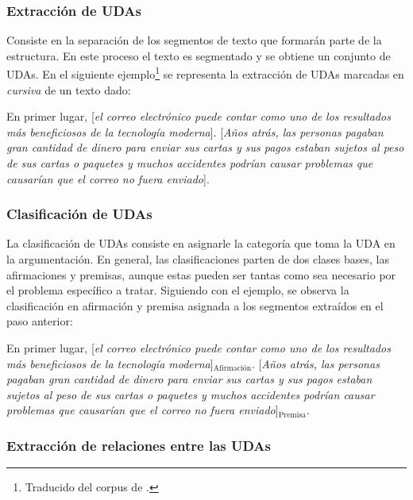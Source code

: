 \documentclass[a4paper,11pt,twocolumn,twoside]{article}
\begin{document}
\subsubsection{Extracción de UDAs}

Consiste en la separación de los segmentos de texto que formarán parte de la estructura.
En este proceso el texto es segmentado y se obtiene un conjunto de UDAs. En el siguiente 
ejemplo\footnote{Traducido del corpus de 
\textcite{stab2017parsing}
.} se representa 
la extracción de UDAs marcadas en \textit{cursiva} de un texto dado:

\begin{adjustwidth}{25pt}{25pt}
    En primer lugar, [\textit{el correo electrónico puede contar como uno de los resultados
    más beneficiosos de la tecnología moderna}]. [\textit{Años atrás, las personas pagaban gran cantidad de dinero para 
    enviar sus cartas y sus pagos estaban sujetos al peso de sus cartas o paquetes y muchos accidentes podrían 
    causar problemas que causarían que el correo no fuera enviado}].
\end{adjustwidth}

\subsubsection{Clasificación de UDAs}

La clasificación de UDAs consiste en asignarle la categoría que toma la UDA en la argumentación. En general, 
las clasificaciones parten de dos clases bases, las afirmaciones y premisas, aunque estas pueden ser tantas
como sea necesario por el problema específico a tratar. Siguiendo con el ejemplo, se observa la clasificación
en afirmación y premisa asignada a los segmentos extraídos en el paso anterior:

\begin{adjustwidth}{25pt}{25pt}
    En primer lugar, [\textit{el correo electrónico puede contar como uno de los resultados
    más beneficiosos de la tecnología moderna}]$_{\mathrm{Afirmación}}$. [\textit{Años atrás, las personas pagaban gran cantidad de dinero para 
    enviar sus cartas y sus pagos estaban sujetos al peso de sus cartas o paquetes y muchos accidentes podrían 
    causar problemas que causarían que el correo no fuera enviado}]$_{\mathrm{Premisa}}$.
\end{adjustwidth}

\subsubsection{Extracción de relaciones entre las UDAs}
\end{document}
